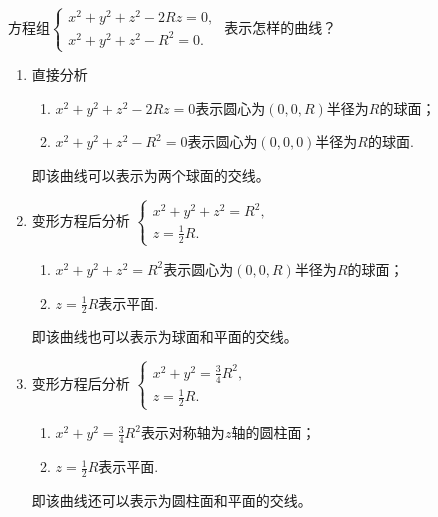 \example[空间曲线举例]
方程组$\displaystyle 
\begin{cases}
x^2+y^2+z^2-2Rz=0,\\
x^2+y^2+z^2-R^2=0.
\end{cases}$
表示怎样的曲线？
\begin{enumerate}[1.]
	\setlength{\itemindent}{2em}
	\setlength{\topsep}{0.01em}
	\setlength{\itemsep}{0.01em}
	\item {\color{dy}直接分析}
	\begin{enumerate}[]
		\setlength{\itemindent}{2em}
		\setlength{\topsep}{0.01em}
		\setlength{\itemsep}{0.01em}
		\item $x^2+y^2+z^2-2Rz=0$表示圆心为$(0,0,R)$半径为$R$的球面；
		\item $x^2+y^2+z^2-R^2=0$表示圆心为$(0,0,0)$半径为$R$的球面.
	\end{enumerate}
	即该曲线可以表示为两个球面的交线。
	\item {\color{dy}变形方程后分析 
		$\displaystyle 
		\begin{cases}
		x^2+y^2+z^2=R^2,\\
		z=\displaystyle \frac{1}{2}R.
		\end{cases}$}
	\begin{enumerate}[]
		\setlength{\itemindent}{2em}
		\setlength{\topsep}{0.01em}
		\setlength{\itemsep}{0.01em}
		\item $x^2+y^2+z^2=R^2$表示圆心为$(0,0,R)$半径为$R$的球面；
		\item $z=\displaystyle  \frac{1}{2}R$表示平面.
	\end{enumerate}
	即该曲线也可以表示为球面和平面的交线。
	\item {\color{dy}变形方程后分析 
		$\displaystyle 
		\begin{cases}
		x^2+y^2=\displaystyle \frac{3}{4} R^2,\\
		z=\displaystyle \frac{1}{2}R.
		\end{cases}$}
	\begin{enumerate}[]
		\setlength{\itemindent}{2em}
		\setlength{\topsep}{0.01em}
		\setlength{\itemsep}{0.01em}
		\item $x^2+y^2=\displaystyle \frac{3}{4} R^2$表示对称轴为$z$轴的圆柱面；
		\item $z=\displaystyle  \frac{1}{2}R$表示平面.
	\end{enumerate}
	即该曲线还可以表示为圆柱面和平面的交线。
\end{enumerate}

